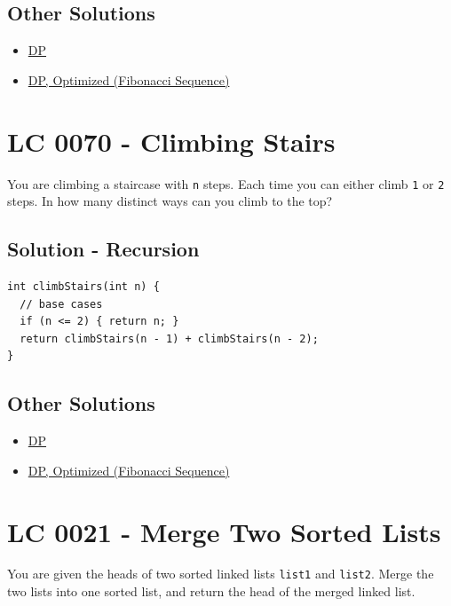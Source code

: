 \subsection*{Other Solutions}
\begin{itemize}
\item \hyperref[solution:lc0509_dp]{DP}
\item \hyperref[solution:lc0509_fibonacci_sequence]{DP, Optimized (Fibonacci Sequence)}
\end{itemize}

\section{LC 0070 - Climbing Stairs}
You are climbing a staircase with {\colorbox{CodeBackground}{\lstinline|n|}} steps. Each time you can either climb {\colorbox{CodeBackground}{\lstinline|1|}} or {\colorbox{CodeBackground}{\lstinline|2|}} steps. In how many distinct ways can you climb to the top?

\subsection*{Solution - Recursion}\label{solution:lc0070_recursion}
\begin{lstlisting}
int climbStairs(int n) {
  // base cases
  if (n <= 2) { return n; }
  return climbStairs(n - 1) + climbStairs(n - 2);
}
\end{lstlisting}

\subsection*{Other Solutions}
\begin{itemize}
\item \hyperref[solution:lc0070_dp]{DP}
\item \hyperref[solution:lc0070_fibonacci_sequence]{DP, Optimized (Fibonacci Sequence)}
\end{itemize}

\section{LC 0021 - Merge Two Sorted Lists}
You are given the heads of two sorted linked lists {\colorbox{CodeBackground}{\lstinline|list1|}} and {\colorbox{CodeBackground}{\lstinline|list2|}}. Merge the two lists into one sorted list, and return the head of the merged linked list.\\

